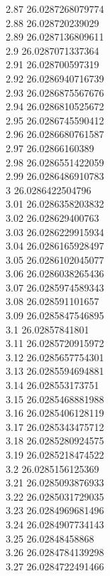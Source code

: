 {2.87	26.0287268079774\\
2.88	26.028720239029\\
2.89	26.0287136809611\\
2.9	26.0287071337364\\
2.91	26.028700597319\\
2.92	26.0286940716739\\
2.93	26.0286875567676\\
2.94	26.0286810525672\\
2.95	26.0286745590412\\
2.96	26.0286680761587\\
2.97	26.02866160389\\
2.98	26.0286551422059\\
2.99	26.0286486910783\\
3	26.0286422504796\\
3.01	26.0286358203832\\
3.02	26.028629400763\\
3.03	26.0286229915934\\
3.04	26.0286165928497\\
3.05	26.0286102045077\\
3.06	26.0286038265436\\
3.07	26.0285974589343\\
3.08	26.028591101657\\
3.09	26.0285847546895\\
3.1	26.02857841801\\
3.11	26.0285720915972\\
3.12	26.0285657754301\\
3.13	26.0285594694881\\
3.14	26.028553173751\\
3.15	26.0285468881988\\
3.16	26.0285406128119\\
3.17	26.0285343475712\\
3.18	26.0285280924575\\
3.19	26.0285218474522\\
3.2	26.0285156125369\\
3.21	26.0285093876933\\
3.22	26.0285031729035\\
3.23	26.0284969681496\\
3.24	26.0284907734143\\
3.25	26.02848458868\\
3.26	26.0284784139298\\
3.27	26.0284722491466\\
}

